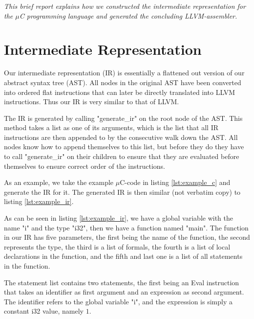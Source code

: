 \textit{This brief report explains how we constructed the intermediate representation for the $\mu$C programming language and generated the concluding LLVM-assembler.}

\section{Intermediate Representation}

Our intermediate representation (IR) is essentially a flattened out version of our abstract syntax tree (AST).
All nodes in the original AST have been converted into ordered flat instructions that can later be directly translated into LLVM instructions. Thus our IR is very similar to that of LLVM.

The IR is generated by calling "generate\_ir" on the root node of the AST. This method takes a list as one of its arguments, which is the list that all IR instructions are then appended to by the consecutive walk down the AST. All nodes know how to append themselves to this list, but before they do they have to call "generate\_ir" on their children to ensure that they are evaluated before themselves to ensure correct order of the instructions.

As an example, we take the example $\mu$C-code in listing \ref{lst:example_c} and generate the IR for it. The generated IR is then similar (not verbatim copy) to listing \ref{lst:example_ir}.





As can be seen in listing \ref{lst:example_ir}, we have a global variable with the name "i" and the type "i32", then we have a function named "main". The function in our IR has five parameters, the first being the name of the function, the second represents the type, the third is a list of formals, the fourth is a list of local declarations in the function, and the fifth and last one is a list of all statements in the function.

The statement list contains two statements, the first being an Eval instruction that takes an identifier as first argument and an expression as second argument. The identifier refers to the global variable "i", and the expression is simply a constant i32 value, namely $1$.

